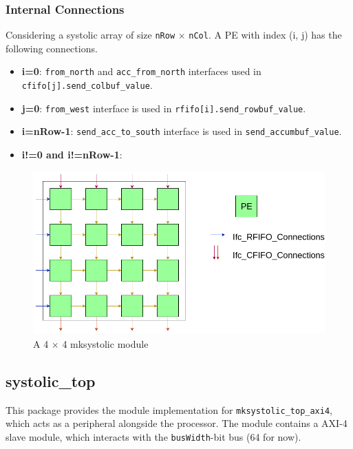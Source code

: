 \documentclass{article}
\begin{document}
\subsubsection{Internal Connections}
Considering a systolic array of size \texttt{nRow} $\times$ \texttt{nCol}. A PE with index (i, j) has the following connections.

\begin{itemize}
  \item \textbf{i=0}: \texttt{from\_north} and \texttt{acc\_from\_north} interfaces used in \texttt{cfifo[j].send\_colbuf\_value}.
  \item \textbf{j=0}: \texttt{from\_west} interface is used in \texttt{rfifo[i].send\_rowbuf\_value}.
  \item \textbf{i=nRow-1}: \texttt{send\_acc\_to\_south} interface is used in \texttt{send\_accumbuf\_value}.
  \item \textbf{i!=0 and i!=nRow-1}:
\end{itemize}

\begin{figure}
  \centering
  \includegraphics[scale=0.4]{./images/mksystolic.png}
  \caption{A 4 $\times$ 4 mksystolic module}
  \label{fig:fig1}
\end{figure}

\subsection{systolic\_top}

This package provides the module implementation for \texttt{mksystolic\_top\_axi4}, which acts as a peripheral alongside the processor. The module contains a AXI-4 slave module, which interacts with the \texttt{busWidth}-bit bus (64 for now). 
\end{document}
